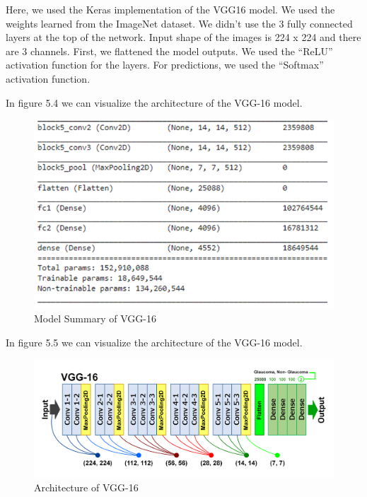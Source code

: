 \vspace{5mm}
\noindent Here, we used the Keras implementation of the VGG16 model. We used the weights learned from the ImageNet dataset. We didn’t use the 3 fully connected layers at the top of the network. Input shape of the images is 224 x 224 and there are 3 channels. First, we flattened the model outputs. We used the “ReLU” activation function for the layers. For predictions, we used the “Softmax” activation function. 

\vspace{5mm}
\noindent In figure 5.4 we can visualize the architecture of the VGG-16  model.

\vspace{5mm}
\begin{figure}[hbt!]
\centering
\includegraphics[scale=0.5]{images/fig-8.png}
\caption{Model Summary of VGG-16}
\label{fig:x Model Summary of VGG-16}
\end{figure}

\vspace{5mm}
\noindent In figure 5.5 we can visualize the architecture of the VGG-16  model.

\vspace{5mm}
\begin{figure}[hbt!]
\centering
\includegraphics[scale=0.75]{images/Architecture of VGG-16.png}
\caption{Architecture of VGG-16}
\label{fig:x Architecture of VGG-16}
\end{figure}

